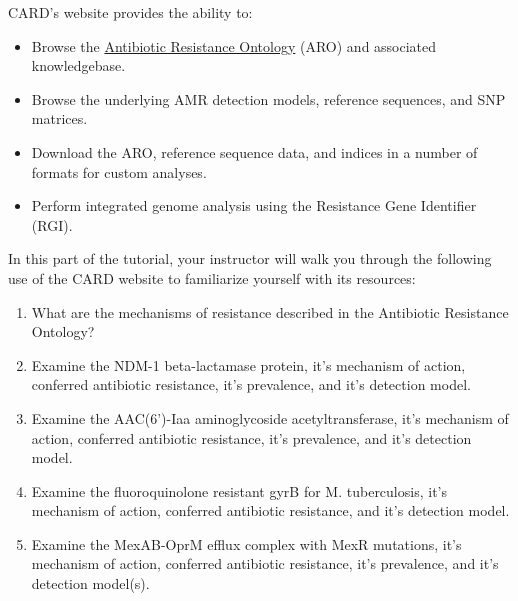 \documentclass[
]{book}
\providecommand{\tightlist}{%
  \setlength{\itemsep}{0pt}\setlength{\parskip}{0pt}}
\begin{document}
CARD's website provides the ability to:

\begin{itemize}
\tightlist
\item
  Browse the \href{https://card.mcmaster.ca/ontology/36006}{Antibiotic Resistance Ontology} (ARO) and associated knowledgebase.
\item
  Browse the underlying AMR detection models, reference sequences, and SNP matrices.
\item
  Download the ARO, reference sequence data, and indices in a number of formats for custom analyses.
\item
  Perform integrated genome analysis using the Resistance Gene Identifier (RGI).
\end{itemize}

In this part of the tutorial, your instructor will walk you through the following use of the CARD website to familiarize yourself with its resources:

\begin{enumerate}
\def\labelenumi{\arabic{enumi}.}
\tightlist
\item
  What are the mechanisms of resistance described in the Antibiotic Resistance Ontology?
\item
  Examine the NDM-1 beta-lactamase protein, it's mechanism of action, conferred antibiotic resistance, it's prevalence, and it's detection model.
\item
  Examine the AAC(6')-Iaa aminoglycoside acetyltransferase, it's mechanism of action, conferred antibiotic resistance, it's prevalence, and it's detection model.
\item
  Examine the fluoroquinolone resistant gyrB for M. tuberculosis, it's mechanism of action, conferred antibiotic resistance, and it's detection model.
\item
  Examine the MexAB-OprM efflux complex with MexR mutations, it's mechanism of action, conferred antibiotic resistance, it's prevalence, and it's detection model(s).
\end{enumerate}
\end{document}
